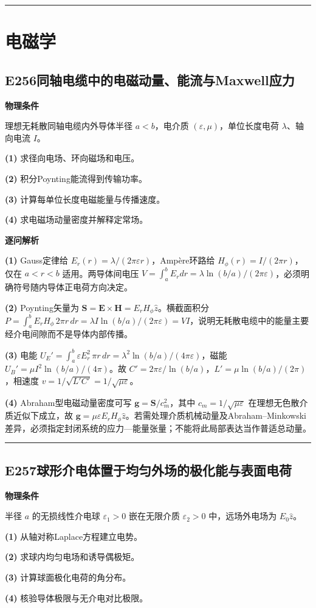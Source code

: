 \documentclass[UTF8,a4paper,11pt,oneside,openany]{ctexbook}
\begin{document}
\par\bigskip\hrule\bigskip
\chapter{电磁学}
\section*{E256\quad 同轴电缆中的电磁动量、能流与Maxwell应力}
\textbf{物理条件}\par 理想无耗散同轴电缆内外导体半径 \(a<b\)，电介质 \((\varepsilon,\mu)\)，单位长度电荷 \(\lambda\)、轴向电流 \(I\)。
\par\noindent\textbf{(1)} 求径向电场、环向磁场和电压。
\par\noindent\textbf{(2)} 积分Poynting能流得到传输功率。
\par\noindent\textbf{(3)} 计算每单位长度电磁能量与传播速度。
\par\noindent\textbf{(4)} 求电磁场动量密度并解释定常场。

\par\medskip\noindent\textbf{逐问解析}
\par\noindent\textbf{(1)} Gauss定律给 \(E_r(r)=\lambda/(2\pi\varepsilon r)\)，Ampère环路给 \(H_\phi(r)=I/(2\pi r)\)，仅在 \(a<r<b\) 适用。两导体间电压 \(V=\int_a^bE_rdr=\lambda\ln(b/a)/(2\pi\varepsilon)\)，必须明确符号随内导体正电荷方向决定。
\par\noindent\textbf{(2)} Poynting矢量为 \(\boldsymbol S=\boldsymbol E\times\boldsymbol H=E_rH_\phi\hat z\)。横截面积分 \(P=\int_a^bE_rH_\phi\,2\pi r\,dr=\lambda I\ln(b/a)/(2\pi\varepsilon)=VI\)，说明无耗散电缆中的能量主要经介电间隙而不是导体内部传播。
\par\noindent\textbf{(3)} 电能 \(U_E'=\int_a^b\varepsilon E_r^2\,\pi r\,dr=\lambda^2\ln(b/a)/(4\pi\varepsilon)\)，磁能 \(U_B'=\mu I^2\ln(b/a)/(4\pi)\)。故 \(C'=2\pi\varepsilon/\ln(b/a)\)，\(L'=\mu\ln(b/a)/(2\pi)\)，相速度 \(v=1/\sqrt{L'C'}=1/\sqrt{\mu\varepsilon}\)。
\par\noindent\textbf{(4)} Abraham型电磁动量密度可写 \(\boldsymbol g=\boldsymbol S/c_m^2\)，其中 \(c_m=1/\sqrt{\mu\varepsilon}\) 在理想无色散介质近似下成立，故 \(\boldsymbol g=\mu\varepsilon E_rH_\phi\hat z\)。若需处理介质机械动量及Abraham–Minkowski差异，必须指定封闭系统的应力—能量张量；不能将此局部表达当作普适总动量。

\par\bigskip\hrule\bigskip
\section*{E257\quad 球形介电体置于均匀外场的极化能与表面电荷}
\textbf{物理条件}\par 半径 \(a\) 的无损线性介电球 \(\varepsilon_1>0\) 嵌在无限介质 \(\varepsilon_2>0\) 中，远场外电场为 \(E_0\hat z\)。
\par\noindent\textbf{(1)} 从轴对称Laplace方程建立电势。
\par\noindent\textbf{(2)} 求球内均匀电场和诱导偶极矩。
\par\noindent\textbf{(3)} 计算球面极化电荷的角分布。
\par\noindent\textbf{(4)} 核验导体极限与无介电对比极限。
\end{document}

